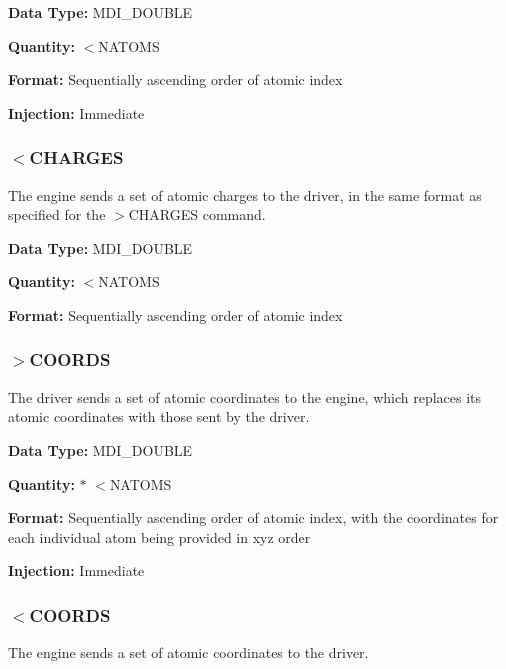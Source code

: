 \begin{DoxyParagraph}{}
{\bfseries  Data Type\-: } M\-D\-I\-\_\-\-D\-O\-U\-B\-L\-E \par
 {\bfseries  Quantity\-: } {\ttfamily $<$N\-A\-T\-O\-M\-S} \par
 {\bfseries  Format\-: } Sequentially ascending order of atomic index \par
 {\bfseries  Injection\-: } Immediate \par

\end{DoxyParagraph}
\hypertarget{index_recv_charges}{}\subsubsection{$<$\-C\-H\-A\-R\-G\-E\-S}\label{index_recv_charges}
The engine sends a set of atomic charges to the driver, in the same format as specified for the {\ttfamily $>$C\-H\-A\-R\-G\-E\-S} command.

\begin{DoxyParagraph}{}
{\bfseries  Data Type\-: } M\-D\-I\-\_\-\-D\-O\-U\-B\-L\-E \par
 {\bfseries  Quantity\-: } {\ttfamily $<$N\-A\-T\-O\-M\-S} \par
 {\bfseries  Format\-: } Sequentially ascending order of atomic index
\end{DoxyParagraph}
\hypertarget{index_send_coords}{}\subsubsection{$>$\-C\-O\-O\-R\-D\-S}\label{index_send_coords}
The driver sends a set of atomic coordinates to the engine, which replaces its atomic coordinates with those sent by the driver.

\begin{DoxyParagraph}{}
{\bfseries  Data Type\-: } M\-D\-I\-\_\-\-D\-O\-U\-B\-L\-E \par
 {\bfseries  Quantity\-: } { $\ast$ $<$N\-A\-T\-O\-M\-S } \par
 {\bfseries  Format\-: } Sequentially ascending order of atomic index, with the coordinates for each individual atom being provided in xyz order \par
 {\bfseries  Injection\-: } Immediate
\end{DoxyParagraph}
\hypertarget{index_recv_coords}{}\subsubsection{$<$\-C\-O\-O\-R\-D\-S}\label{index_recv_coords}
The engine sends a set of atomic coordinates to the driver.

